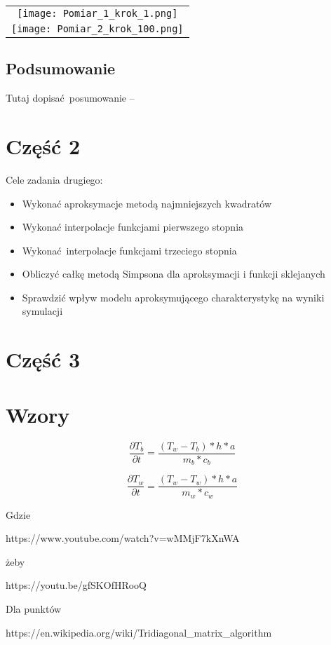 \documentclass[varwidth,12pt,a4paper]{article}
\begin{document}
\begin{tabular}{c}
    \texttt{[image: Pomiar\_1\_krok\_1.png]} \\
    \texttt{[image: Pomiar\_2\_krok\_100.png]} 
\end{tabular}

\subsection{Podsumowanie}

Tutaj dopisać posumowanie --

\section{Część 2}

Cele zadania drugiego:

\begin{itemize}
  \item Wykonać aproksymacje metodą najmniejszych kwadratów
  \item Wykonać interpolacje funkcjami pierwszego stopnia
  \item Wykonać interpolacje funkcjami trzeciego stopnia
  \item Obliczyć całkę metodą Simpsona dla aproksymacji i funkcji sklejanych
  \item Sprawdzić wpływ modelu aproksymującego charakterystykę na wyniki symulacji
\end{itemize}

\section{Część 3}

\section{Wzory}

\begin{equation}
    \frac{\partial T_b}{\partial t}=\frac{(T_w-T_b)*h*a}{m_b*c_b}
\end{equation}

\begin{equation}
    \frac{\partial T_w}{\partial t}=\frac{(T_w-T_w)*h*a}{m_w*c_w}
\end{equation}

Gdzie 

https://www.youtube.com/watch?v=wMMjF7kXnWA

żeby 

https://youtu.be/gfSKOfHRooQ



Dla punktów 

https://en.wikipedia.org/wiki/Tridiagonal_matrix_algorithm
\end{document}
